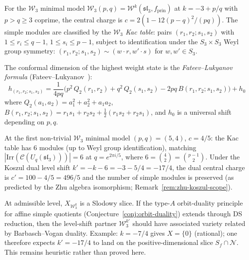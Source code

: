 \begin{example}
\label{ex:w3-minimal-modules}
For the $\mathcal{W}_3$ minimal model
$\mathcal{W}_3(p,q) = \mathcal{W}^k(\mathfrak{sl}_3,
f_{\mathrm{prin}})$ at $k = -3 + p/q$ with $p > q \geq 3$
coprime, the central charge is
$c = 2(1 - 12(p-q)^2/(pq))$.  The simple modules are
classified by the \emph{$\mathcal{W}_3$ Kac table}: pairs
$(r_1, r_2; s_1, s_2)$ with
$1 \leq r_i \leq q - 1$, $1 \leq s_i \leq p - 1$, subject to
identification under the $S_3 \times S_3$ Weyl group symmetry:
$(r_1, r_2; s_1, s_2) \sim (w \cdot r, w' \cdot s)$ for
$w, w' \in S_3$.

The conformal dimension of the highest weight state is the
\emph{Fateev--Lukyanov formula}
(Fateev--Lukyanov~\cite{FL88}):
\begin{equation}\label{eq:w3-kac-dimension}
h_{(r_1,r_2;s_1,s_2)}
= \frac{1}{4pq}\bigl(
  p^2\, Q_2(r_1, r_2) + q^2\, Q_2(s_1, s_2) - 2pq\,
  B(r_1, r_2; s_1, s_2)
\bigr) + h_0
\end{equation}
where $Q_2(a_1, a_2) = a_1^2 + a_2^2 + a_1 a_2$,
$B(r_1, r_2; s_1, s_2) = r_1 s_1 + r_2 s_2 + \frac{1}{2}
(r_1 s_2 + r_2 s_1)$, and $h_0$ is a universal shift
depending on $p, q$.

At the first non-trivial $\mathcal{W}_3$ minimal model
$(p,q) = (5,4)$, $c = 4/5$: the Kac table has
$6$ modules (up to Weyl group identification), matching
$|\mathrm{Irr}(\mathcal{C}(U_q(\mathfrak{sl}_3)))| = 6$
at $q = e^{2\pi i/5}$, where
$6 = \binom{4}{2} = \binom{p-1}{2}$.  Under the Koszul dual
level shift $k' = -k - 6 = -3 - 5/4 = -17/4$, the dual
central charge is $c' = 100 - 4/5 = 496/5$ and the number of
simple modules is preserved (as predicted by the Zhu algebra
isomorphism; Remark~\ref{rem:zhu-koszul-scope}).
\end{example}

\begin{remark}
\label{rem:w3-orbit-duality}
At admissible level, $X_{\mathcal{W}_3^k}$ is a Slodowy slice.  If the
type-$A$ orbit-duality principle for affine simple quotients
\textup{(}Conjecture~\textup{\ref{conj:orbit-duality}}\textup{)}
extends through DS reduction, then the level-shift partner
$\mathcal{W}_3^{k'}$ should have associated variety related by
Barbasch--Vogan duality.  Example: $k = -7/4$ gives $X = \{0\}$
(rational); one therefore expects $k' = -17/4$ to land on the
positive-dimensional slice $S_f \cap \mathcal{N}$.  This remains
heuristic rather than proved here.
\end{remark}

